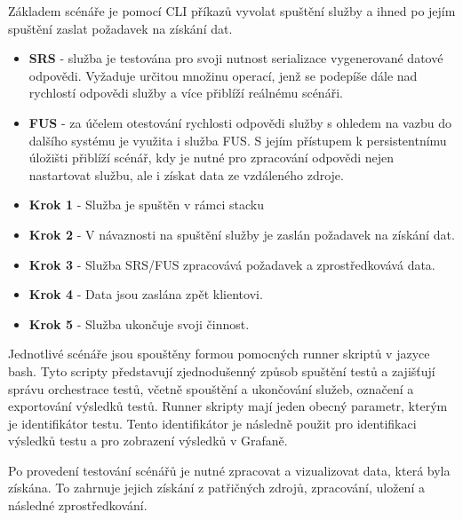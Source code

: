 Základem scénáře je pomocí CLI příkazů vyvolat spuštění služby a ihned po jejím spuštění zaslat požadavek na získání dat.



\begin{itemize}
    \item \textbf{SRS} - služba je testována pro svoji nutnost serializace vygenerované datové odpovědi. Vyžaduje určitou množinu operací, jenž se podepíše dále nad rychlostí odpovědi služby a více přiblíží reálnému scénáři.
    \item \textbf{FUS} - za účelem otestování rychlosti odpovědi služby s ohledem na vazbu do dalšího systému je využita i služba FUS. S jejím přístupem k persistentnímu úložišti přiblíží scénář, kdy je nutné pro zpracování odpovědi nejen nastartovat službu, ale i získat data ze vzdáleného zdroje.
\end{itemize}


\begin{itemize}
    \item \textbf{Krok 1} - Služba je spuštěn v rámci stacku
    \item \textbf{Krok 2} - V návaznosti na spuštění služby je zaslán požadavek na získání dat.
    \item \textbf{Krok 3} - Služba SRS/FUS zpracovává požadavek a zprostředkovává data.
    \item \textbf{Krok 4} - Data jsou zaslána zpět klientovi.
    \item \textbf{Krok 5} - Služba ukončuje svoji činnost.
\end{itemize}


Jednotlivé scénáře jsou spouštěny formou pomocných runner skriptů v jazyce bash. Tyto scripty představují zjednodušenný způsob spuštění testů a zajišťují správu orchestrace testů, včetně spouštění a ukončování služeb, označení a exportování výsledků testů. Runner skripty mají jeden obecný parametr, kterým je identifikátor testu. Tento identifikátor je následně použit pro identifikaci výsledků testu a pro zobrazení výsledků v Grafaně.


Po provedení testování scénářů je nutné zpracovat a vizualizovat data, která byla získána. To zahrnuje jejich získání z patřičných zdrojů, zpracování, uložení a následné zprostředkování.

